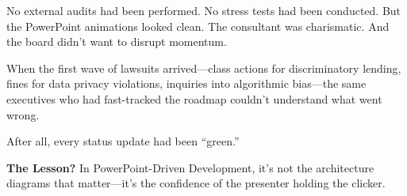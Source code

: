 No external audits had been performed. No stress tests had been conducted. But the PowerPoint animations looked clean. The consultant was charismatic. And the board didn’t want to disrupt momentum.

When the first wave of lawsuits arrived—class actions for discriminatory lending, fines for data privacy violations, inquiries into algorithmic bias—the same executives who had fast-tracked the roadmap couldn’t understand what went wrong.

After all, every status update had been “green.”

\medskip

\textbf{The Lesson?}  
In PowerPoint-Driven Development, it’s not the architecture diagrams that matter—it’s the confidence of the presenter holding the clicker.

